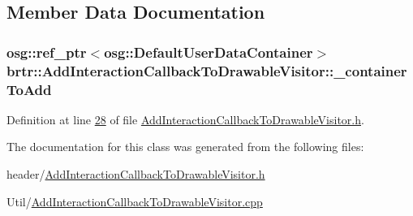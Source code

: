 \subsection{Member Data Documentation}
\hypertarget{classbrtr_1_1_add_interaction_callback_to_drawable_visitor_ac23b4a99b1d35c2f7a32f048d4628927}{
\subsubsection[{\+\_\+container\+To\+Add}]{\setlength{\rightskip}{0pt plus 5cm}osg\+::ref\+\_\+ptr$<$osg\+::\+Default\+User\+Data\+Container$>$ brtr\+::\+Add\+Interaction\+Callback\+To\+Drawable\+Visitor\+::\+\_\+container\+To\+Add\hspace{0.3cm}{\ttfamily [private]}}}\label{classbrtr_1_1_add_interaction_callback_to_drawable_visitor_ac23b4a99b1d35c2f7a32f048d4628927}


Definition at line \hyperlink{_add_interaction_callback_to_drawable_visitor_8h_source_l00028}{28} of file \hyperlink{_add_interaction_callback_to_drawable_visitor_8h_source}{Add\+Interaction\+Callback\+To\+Drawable\+Visitor.\+h}.



The documentation for this class was generated from the following files\+:\begin{DoxyCompactItemize}
\item 
header/\hyperlink{_add_interaction_callback_to_drawable_visitor_8h}{Add\+Interaction\+Callback\+To\+Drawable\+Visitor.\+h}\item 
Util/\hyperlink{_add_interaction_callback_to_drawable_visitor_8cpp}{Add\+Interaction\+Callback\+To\+Drawable\+Visitor.\+cpp}\end{DoxyCompactItemize}
